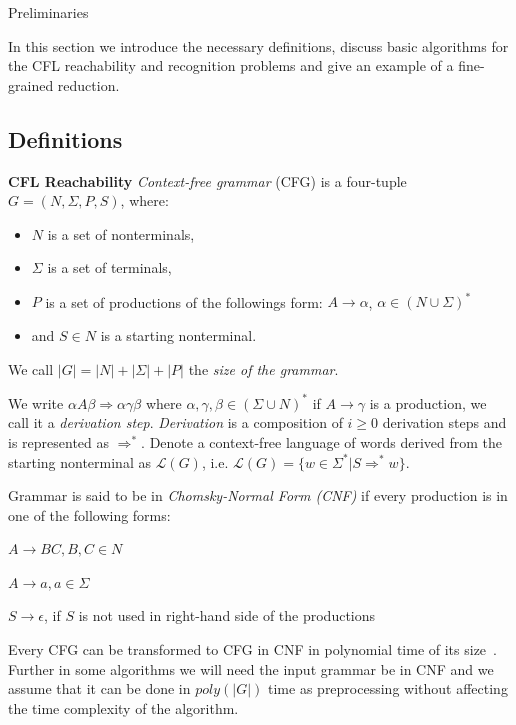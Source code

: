 \documentclass[12pt]{article}
\let\origenumerate\enumerate
\let\origendenumerate\endenumerate
\renewenvironment{enumerate}{\origenumerate[topsep = 0pt, noitemsep]}{\origendenumerate}
\begin{document}
\begin{section}{Preliminaries}
\label{sec:prelim}

In this section we introduce the necessary definitions, discuss basic algorithms for the CFL reachability and recognition problems and give an example of a fine-grained reduction.

\subsection{Definitions}
\label{subsec:def}

\textbf{CFL Reachability}
	\emph{Context-free grammar} (CFG) is a four-tuple $G=(N, \Sigma, P, S)$, where:
	
	\begin{itemize}
	    \item $N$ is a set of nonterminals,
	    \item $\Sigma$ is a set of terminals,
	    \item $P$ is a set of productions of the followings form: $A \to \alpha$, $\alpha \in (N \cup \Sigma)^*$
	    \item and $S \in N$ is a starting nonterminal.
	\end{itemize}
	
	We call $|G| = |N| + |\Sigma| + |P|$ the \textit{size of the grammar}. 
	
	We write $\alpha A \beta \Rightarrow \alpha \gamma \beta$ where $\alpha, \gamma, \beta \in (\Sigma \cup N)^*$ if $A \rightarrow \gamma$ is a production, we call it a \textit{derivation step}. \textit{Derivation} is a composition of $i \ge 0$ derivation steps and is represented as $\Rightarrow^*$. Denote a context-free language of words derived from the starting nonterminal as $\mathcal{L}(G)$, i.e. $\mathcal{L}(G) = \{w \in \Sigma^*| S \Rightarrow^* w\}$.
	
	Grammar is said to be in \textit{Chomsky-Normal Form (CNF)} if every production is in one of the following forms:
	
	\begin{enumerate}
	    \item $A \rightarrow BC, B, C \in N$
	    \item $A \rightarrow a, a \in \Sigma$
	    \item $S \rightarrow \epsilon$, if $S$ is not used in right-hand side of the productions
	\end{enumerate}
	
	Every CFG can be transformed to CFG in CNF in polynomial time of its size~\cite{CHOMSKY1959137}. Further in some algorithms we will need the input grammar be in CNF and we assume that it can be done in $poly(|G|)$ time as preprocessing without affecting the time complexity of the algorithm.
	

\end{section}
\end{document}
